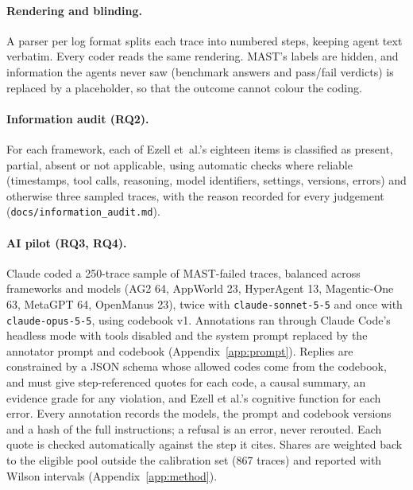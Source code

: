 \documentclass[10pt]{article}
\newcommand{\code}[1]{\texttt{#1}}
\begin{document}
\paragraph{Rendering and blinding.} A parser per log format splits each trace into
numbered steps, keeping agent text verbatim. Every coder reads the same rendering.
MAST's labels are hidden, and information the agents never saw (benchmark answers
and pass/fail verdicts) is replaced by a placeholder, so that the outcome cannot
colour the coding.

\paragraph{Information audit (RQ2).} For each framework, each of Ezell et~al.'s
eighteen items is classified as present, partial, absent or not applicable, using
automatic checks where reliable (timestamps, tool calls, reasoning, model
identifiers, settings, versions, errors) and otherwise three sampled traces, with
the reason recorded for every judgement (\code{docs/information\_audit.md}).

\paragraph{AI pilot (RQ3, RQ4).} Claude coded a 250-trace sample of MAST-failed
traces, balanced across frameworks and models (AG2 64, AppWorld 23, HyperAgent 13,
Magentic-One 63, MetaGPT 64, OpenManus 23), twice with \code{claude-sonnet-5-5}
and once with \code{claude-opus-5-5}, using codebook v1. Annotations ran through
Claude Code's headless mode with tools disabled and the system prompt replaced by the annotator prompt and codebook (Appendix~\ref{app:prompt}). Replies are constrained by a JSON schema whose
allowed codes come from the codebook, and must give step-referenced quotes for
each code, a causal summary, an evidence grade for any violation, and Ezell et
al.'s cognitive function for each error. Every annotation records the models, the
prompt and codebook versions and a hash of the full instructions; a refusal is an
error, never rerouted. Each quote is checked automatically against the step it
cites. Shares are weighted back to the eligible pool outside the calibration set
(867 traces) and reported with Wilson
intervals (Appendix~\ref{app:method}).
\end{document}
